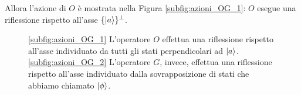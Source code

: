 Allora l'azione di $O$ è mostrata nella Figura \ref{subfig:azioni_OG_1}:  $O$ esegue una riflessione rispetto all'asse $\{\ket a\}^\perp$.
\begin{figure}[!t]
	\centering	
	 \quad
	\caption{\eqref{subfig:azioni_OG_1} L'operatore $O$ effettua una riflessione rispetto all'asse individuato da tutti gli stati perpendicolari ad $\ket{a}$. \eqref{subfig:azioni_OG_2} L'operatore $G$, invece, effettua una riflessione rispetto all'asse individuato dalla sovrapposizione di stati che abbiamo chiamato $\ket{\phi}$.}
\label{fig:azioni_OG}
\end{figure}
